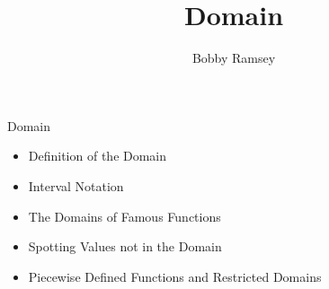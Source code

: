 \documentclass{ximera}
\author{Bobby Ramsey}
\title{Domain}
\begin{document}
\begin{abstract}
\end{abstract}
\maketitle


\begin{objectives}

\item Domain
\begin{itemize}
	\item Definition of the Domain
	\item Interval Notation 
	\item The Domains of Famous Functions 
	\item Spotting Values not in the Domain
	\item Piecewise Defined Functions and Restricted Domains 
\end{itemize}



\end{objectives}
\end{document}
